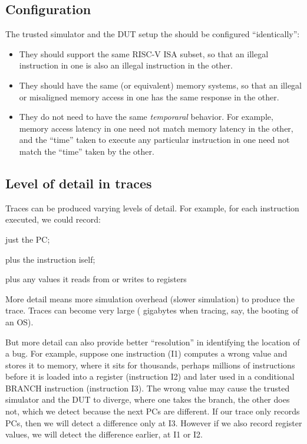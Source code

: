 
\subsection{Configuration}

The trusted simulator and the DUT setup the should be configured
``identically'':

\begin{itemize}
 \item They should support the same RISC-V ISA subset, so that an
       illegal instruction in one is also an illegal instruction in the
       other.  

 \item They should have the same (or equivalent) memory systems, so
       that an illegal or misaligned memory access in one has the same
       response in the other.

 \item They do not need to have the same \emph{temporaral} behavior.
       For example, memory access latency in one need not match memory
       latency in the other, and the ``time'' taken to execute any
       particular instruction in one need not match the ``time'' taken
       by the other.

\end{itemize}


\subsection{Level of detail in traces}

Traces can be produced varying levels of detail.  For example, for
each instruction executed, we could record:

\begin{tightlist}
 \item just the PC;
 \item plus the instruction iself;
 \item plus any values it reads from or writes to registers
\end{tightlist}

More detail means more simulation overhead (slower simulation) to
produce the trace.  Traces can become very large ({\eg} gigabytes when
tracing, say, the booting of an OS).

But more detail can also provide better ``resolution'' in identifying
the location of a bug.  For example, suppose one instruction (I1)
computes a wrong value and stores it to memory, where it sits for
thousands, perhaps millions of instructions before it is loaded into a
register (instruction I2) and later used in a conditional BRANCH
instruction (instruction I3).  The wrong value may cause the trusted
simulator and the DUT to diverge, where one takes the branch, the
other does not, which we detect because the next PCs are different.
If our trace only records PCs, then we will detect a difference only
at I3. However if we also record register values, we will detect the
difference earlier, at I1 or I2.

